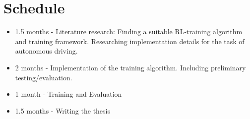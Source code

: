 \chapter{Schedule}
\label{cha:Schedule}


\begin{itemize}
    \item 1.5 months - Literature research: Finding a suitable RL-training algorithm and training framework. Researching implementation details for the task of autonomous driving. 
    \item 2 months - Implementation of the training algorithm. Including preliminary testing/evaluation.
    \item 1 month - Training and Evaluation
    \item 1.5 months - Writing the thesis
\end{itemize}